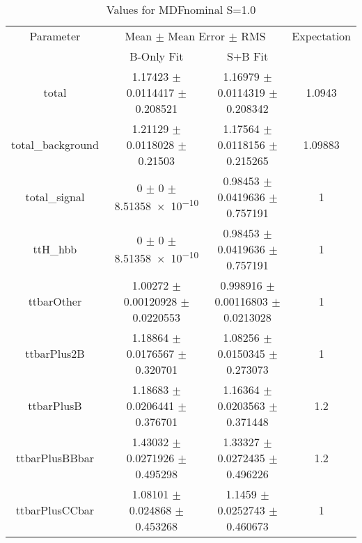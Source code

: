 \begin{table}
\centering
\caption{Values for MDFnominal S=1.0}
\begin{tabular}{cccc}
\toprule
Parameter & \multicolumn{2}{c}{Mean $\pm$ Mean Error $\pm$ RMS} & Expectation\\
 & B-Only Fit & S+B Fit & \\
\midrule
total & \num{1.17423} $\pm$ \num{0.0114417} $\pm$ \num{0.208521} & \num{1.16979} $\pm$ \num{0.0114319} $\pm$ \num{0.208342} & \num{1.0943}\\
total\_background & \num{1.21129} $\pm$ \num{0.0118028} $\pm$ \num{0.21503} & \num{1.17564} $\pm$ \num{0.0118156} $\pm$ \num{0.215265} & \num{1.09883}\\
total\_signal & \num{0} $\pm$ \num{0} $\pm$ \num{8.51358e-10} & \num{0.98453} $\pm$ \num{0.0419636} $\pm$ \num{0.757191} & \num{1}\\
ttH\_hbb & \num{0} $\pm$ \num{0} $\pm$ \num{8.51358e-10} & \num{0.98453} $\pm$ \num{0.0419636} $\pm$ \num{0.757191} & \num{1}\\
ttbarOther & \num{1.00272} $\pm$ \num{0.00120928} $\pm$ \num{0.0220553} & \num{0.998916} $\pm$ \num{0.00116803} $\pm$ \num{0.0213028} & \num{1}\\
ttbarPlus2B & \num{1.18864} $\pm$ \num{0.0176567} $\pm$ \num{0.320701} & \num{1.08256} $\pm$ \num{0.0150345} $\pm$ \num{0.273073} & \num{1}\\
ttbarPlusB & \num{1.18683} $\pm$ \num{0.0206441} $\pm$ \num{0.376701} & \num{1.16364} $\pm$ \num{0.0203563} $\pm$ \num{0.371448} & \num{1.2}\\
ttbarPlusBBbar & \num{1.43032} $\pm$ \num{0.0271926} $\pm$ \num{0.495298} & \num{1.33327} $\pm$ \num{0.0272435} $\pm$ \num{0.496226} & \num{1.2}\\
ttbarPlusCCbar & \num{1.08101} $\pm$ \num{0.024868} $\pm$ \num{0.453268} & \num{1.1459} $\pm$ \num{0.0252743} $\pm$ \num{0.460673} & \num{1}\\
\bottomrule
\end{tabular}
\end{table}